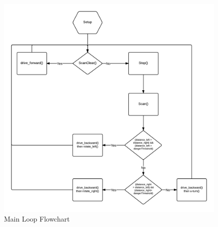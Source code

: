\documentclass[11pt]{article}
\begin{document}
	\begin{figure}[h]\centering
	\includegraphics[height=0.85\textwidth]{images/main.png}
	\caption{Main Loop Flowchart}
		\label{main}
	\end{figure}
\end{document}
